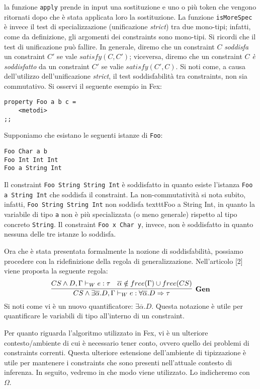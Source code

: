 \documentclass[10pt,a4paper]{article}
\begin{document}
la funzione \texttt{apply} prende in input una sostituzione e uno o più token che vengono ritornati dopo che è stata
applicata loro la sostituzione. La funzione \texttt{isMoreSpec} è invece il test di specializzazione (unificazione
\textit{strict}) tra due mono-tipi; infatti, come da definizione, gli argomenti dei constraints sono mono-tipi.
Si ricordi che il test di unificazione può fallire. In generale, diremo che un constraint $ C $ \textit{soddisfa} un
constraint $ C' $ se vale $ satisfy(C, C') $; viceversa, diremo che un constraint $ C $ \textit{è soddisfatto} da un
constraint $ C' $ se valie $ satisfy(C', C) $.
Si noti come, a causa dell'utilizzo dell'unificazione \textit{strict}, il test soddisfabilità tra constraints, non sia
commutativo. Si osservi il seguente esempio in Fex:
\begin{lstlisting}
property Foo a b c =
    <metodi>
;;
\end{lstlisting}
Supponiamo che esistano le seguenti istanze di \texttt{Foo}:
\begin{lstlisting}
Foo Char a b
Foo Int Int Int
Foo a String Int
\end{lstlisting}
Il constraint \texttt{Foo String String Int} è soddisfatto in quanto esiste l'istanza \texttt{Foo a String Int} che
soddisfa il constraint. La non-commutatività si nota subito, infatti, \texttt{Foo String String Int} non soddisfa
texttt{Foo a String Int}, in quanto la variabile di tipo \texttt{a} non è più specializzata (o meno generale) rispetto
al tipo concreto \texttt{String}. Il constraint \texttt{Foo x Char y}, invece, non è soddisfatto in quanto nessuna
delle tre istanze lo soddisfa.

Ora che è stata presentata formalmente la nozione di soddisfabilità, possiamo procedere con la ridefinizione della
regola di generalizzazione. Nell'articolo [2] viene proposta la seguente regola:
\[ \infer[\textbf{Gen}]{CS \wedge \exists \overline{\alpha}. D, \Gamma \vdash_W e : \forall \overline{\alpha}. D \Rightarrow \tau}{CS \wedge D, \Gamma \vdash_W e : \tau & \overline{\alpha} \notin free(\Gamma) \cup free(CS)} \]
Si noti come vi è un nuovo quantificatore: $ \exists \overline{\alpha}. D $. Questa notazione è utile per quantificare
le variabili di tipo all'interno di un constraint.

Per quanto riguarda l'algoritmo utilizzato in Fex, vi è un ulteriore contesto/ambiente di cui è necessario tener conto,
ovvero quello dei problemi di constraints correnti. Questa ulteriore estensione dell'ambiente di tipizzazione è utile
per mantenere i constraints che sono presenti nell'attuale contesto di inferenza. In seguito, vedremo in che modo
viene utilizzato. Lo indicheremo con $ \Omega $.
\end{document}
